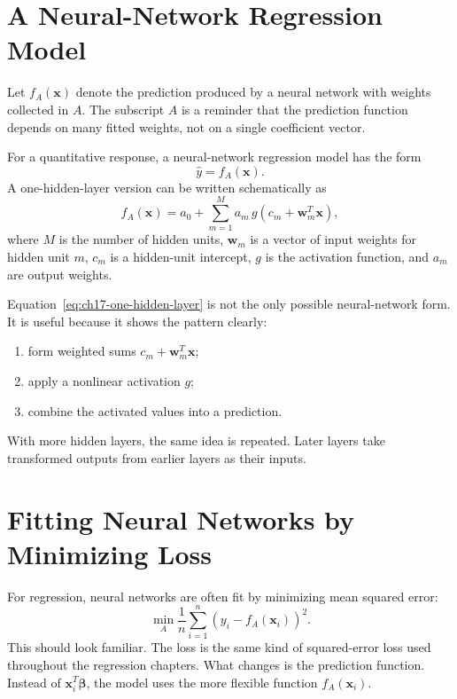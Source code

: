 \section{A Neural-Network Regression Model}

Let \(f_A(\mathbf{x})\) denote the prediction produced by a neural network with weights collected in \(A\).  The subscript \(A\) is a reminder that the prediction function depends on many fitted weights, not on a single coefficient vector.

For a quantitative response, a neural-network regression model has the form
\begin{equation}
  \widehat{y}=f_A(\mathbf{x}).
\end{equation}
A one-hidden-layer version can be written schematically as
\begin{equation}
  f_A(\mathbf{x})
  =a_0+\sum_{m=1}^{M}a_m\,g\left(c_m+\mathbf{w}_m^T\mathbf{x}\right),
  \label{eq:ch17-one-hidden-layer}
\end{equation}
where \(M\) is the number of hidden units, \(\mathbf{w}_m\) is a vector of input weights for hidden unit \(m\), \(c_m\) is a hidden-unit intercept, \(g\) is the activation function, and \(a_m\) are output weights.

Equation~\eqref{eq:ch17-one-hidden-layer} is not the only possible neural-network form.  It is useful because it shows the pattern clearly:
\begin{enumerate}
  \item form weighted sums \(c_m+\mathbf{w}_m^T\mathbf{x}\);
  \item apply a nonlinear activation \(g\);
  \item combine the activated values into a prediction.
\end{enumerate}

With more hidden layers, the same idea is repeated.  Later layers take transformed outputs from earlier layers as their inputs.

\section{Fitting Neural Networks by Minimizing Loss}

For regression, neural networks are often fit by minimizing mean squared error:
\begin{equation}
  \min_A \frac{1}{n}\sum_{i=1}^{n}\left(y_i-f_A(\mathbf{x}_i)\right)^2.
  \label{eq:ch17-nnet-mse}
\end{equation}
This should look familiar.  The loss is the same kind of squared-error loss used throughout the regression chapters.  What changes is the prediction function.  Instead of \(\mathbf{x}_i^T\boldsymbol{\beta}\), the model uses the more flexible function \(f_A(\mathbf{x}_i)\).

